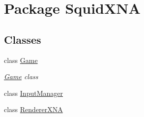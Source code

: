 \hypertarget{namespace_squid_x_n_a}{\section{Package Squid\+X\+N\+A}
\label{namespace_squid_x_n_a}
}
\subsection*{Classes}
\begin{DoxyCompactItemize}
\item 
class \hyperlink{class_squid_x_n_a_1_1_game}{Game}
\begin{DoxyCompactList}\small\item\em \hyperlink{class_squid_x_n_a_1_1_game}{Game} class \end{DoxyCompactList}\item 
class \hyperlink{class_squid_x_n_a_1_1_input_manager}{Input\+Manager}
\item 
class \hyperlink{class_squid_x_n_a_1_1_renderer_x_n_a}{Renderer\+X\+N\+A}
\end{DoxyCompactItemize}
